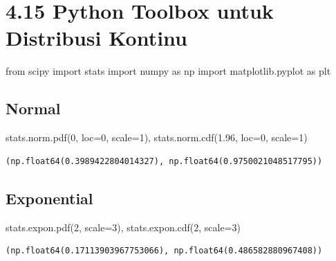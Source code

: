 \documentclass[
  letterpaper,
  DIV=11,
  numbers=noendperiod]{scrreprt}
\newenvironment{Shaded}{\begin{snugshade}}{\end{snugshade}}
\newcommand{\DecValTok}[1]{\textcolor[rgb]{0.68,0.00,0.00}{#1}}
\newcommand{\FloatTok}[1]{\textcolor[rgb]{0.68,0.00,0.00}{#1}}
\newcommand{\ImportTok}[1]{\textcolor[rgb]{0.00,0.46,0.62}{#1}}
\newcommand{\NormalTok}[1]{\textcolor[rgb]{0.00,0.23,0.31}{#1}}
\newcommand{\OperatorTok}[1]{\textcolor[rgb]{0.37,0.37,0.37}{#1}}
\begin{document}
\section{4.15 Python Toolbox untuk Distribusi
Kontinu}\label{python-toolbox-untuk-distribusi-kontinu}

\begin{Shaded}
\begin{Highlighting}[]
\ImportTok{from}\NormalTok{ scipy }\ImportTok{import}\NormalTok{ stats}
\ImportTok{import}\NormalTok{ numpy }\ImportTok{as}\NormalTok{ np}
\ImportTok{import}\NormalTok{ matplotlib.pyplot }\ImportTok{as}\NormalTok{ plt}
\end{Highlighting}
\end{Shaded}

\subsection{Normal}\label{normal}

\begin{Shaded}
\begin{Highlighting}[]
\NormalTok{stats.norm.pdf(}\DecValTok{0}\NormalTok{, loc}\OperatorTok{=}\DecValTok{0}\NormalTok{, scale}\OperatorTok{=}\DecValTok{1}\NormalTok{), stats.norm.cdf(}\FloatTok{1.96}\NormalTok{, loc}\OperatorTok{=}\DecValTok{0}\NormalTok{, scale}\OperatorTok{=}\DecValTok{1}\NormalTok{)}
\end{Highlighting}
\end{Shaded}

\begin{verbatim}
(np.float64(0.3989422804014327), np.float64(0.9750021048517795))
\end{verbatim}

\subsection{Exponential}\label{exponential}

\begin{Shaded}
\begin{Highlighting}[]
\NormalTok{stats.expon.pdf(}\DecValTok{2}\NormalTok{, scale}\OperatorTok{=}\DecValTok{3}\NormalTok{), stats.expon.cdf(}\DecValTok{2}\NormalTok{, scale}\OperatorTok{=}\DecValTok{3}\NormalTok{)}
\end{Highlighting}
\end{Shaded}

\begin{verbatim}
(np.float64(0.17113903967753066), np.float64(0.486582880967408))
\end{verbatim}
\end{document}
